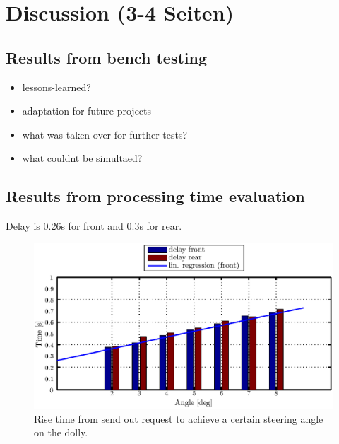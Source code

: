 \documentclass[ExampleMasters.tex]{subfiles}
\begin{document}
\clearpage
{\pagestyle{empty}\cleardoublepage}%
\chapter{Discussion (3-4 Seiten)}
\label{chap:discussion}

\section{Results from bench testing}
\label{sec:results_bench}

\begin{itemize}
	\item lessons-learned?
	\item adaptation for future projects
	\item what was taken over for further tests? 
	\item what couldnt be simultaed?
\end{itemize}

\section{Results from processing time evaluation}
\label{sec:results_processing_time}

Delay is 0.26s for front and 0.3s for rear.

\begin{figure}[!hbt]
\centering
\includegraphics[width=1\linewidth]{figures/delay_testing_lin_interpolation}
\caption{Rise time from send out request to achieve a certain steering angle on the dolly.}
\label{fig:delay_testing_lin_interpolation}
\end{figure}
\end{document}
